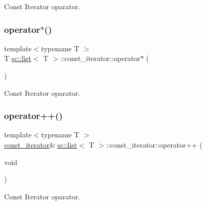 Const Iterator oparator. 

\mbox{\label{classsc_1_1list_1_1const__iterator_a53dc32d1f758d74fcaa761d64949a685}} 
\subsubsection{\texorpdfstring{operator$\ast$()}{operator*()}\hspace{0.1cm}{\footnotesize\ttfamily [2/2]}}
{\footnotesize\ttfamily template$<$typename T $>$ \\
T \hyperlink{classsc_1_1list}{sc\+::list}$<$ T $>$\+::const\+\_\+iterator\+::operator$\ast$ (\begin{DoxyParamCaption}{ }\end{DoxyParamCaption})\hspace{0.3cm}{\ttfamily [inline]}}



Const Iterator oparator. 

\mbox{\label{classsc_1_1list_1_1const__iterator_acc27bef3f35dfdaf23fc43b139d74022}} 
\subsubsection{\texorpdfstring{operator++()}{operator++()}\hspace{0.1cm}{\footnotesize\ttfamily [1/2]}}
{\footnotesize\ttfamily template$<$typename T $>$ \\
\hyperlink{classsc_1_1list_1_1const__iterator}{const\+\_\+iterator}\& \hyperlink{classsc_1_1list}{sc\+::list}$<$ T $>$\+::const\+\_\+iterator\+::operator++ (\begin{DoxyParamCaption}\item[{void}]{ }\end{DoxyParamCaption})\hspace{0.3cm}{\ttfamily [inline]}}



Const Iterator oparator. 

